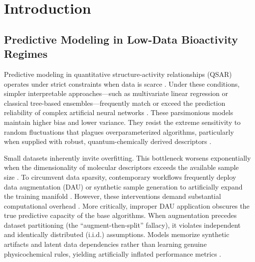 \section{Introduction}


\subsection{Predictive Modeling in Low-Data Bioactivity Regimes}

Predictive modeling in quantitative structure-activity relationships (QSAR) operates under strict constraints when data is scarce \cite{winkler2026}. Under these conditions, simpler interpretable approaches—such as multivariate linear regression or classical tree-based ensembles—frequently match or exceed the prediction reliability of complex artificial neural networks \cite{hadas2023, xiewt2023}. These parsimonious models maintain higher bias and lower variance. They resist the extreme sensitivity to random fluctuations that plagues overparameterized algorithms, particularly when supplied with robust, quantum-chemically derived descriptors \cite{xiewt2023}.

Small datasets inherently invite overfitting. This bottleneck worsens exponentially when the dimensionality of molecular descriptors exceeds the available sample size \cite{hawkins2004, godarzi2013}. To circumvent data sparsity, contemporary workflows frequently deploy data augmentation (DAU) or synthetic sample generation to artificially expand the training manifold \cite{gerz2026, tyler2025}. However, these interventions demand substantial computational overhead \cite{tyler2025, calle2025}. More critically, improper DAU application obscures the true predictive capacity of the base algorithms. When augmentation precedes dataset partitioning (the ``augment-then-split'' fallacy), it violates independent and identically distributed (i.i.d.) assumptions. Models memorize synthetic artifacts and latent data dependencies rather than learning genuine physicochemical rules, yielding artificially inflated performance metrics \cite{gerz2026, john2025, kannoth2024}.

